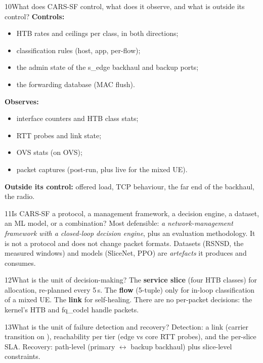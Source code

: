 \begin{qa}{10}{What does CARS-SF control, what does it observe, and what is outside its control?}
\textbf{Controls:}
\begin{itemize}
\item HTB rates and ceilings per class, in both directions;
\item classification rules (host, app, per-flow);
\item the admin state of the s\_edge backhaul and backup ports;
\item the forwarding database (MAC flush).
\end{itemize}
\textbf{Observes:}
\begin{itemize}
\item interface counters and HTB class stats;
\item RTT probes and link state;
\item OVS stats (on OVS);
\item packet captures (post-run, plus live for the mixed UE).
\end{itemize}
\textbf{Outside its control:} offered load, TCP behaviour, the far end of the backhaul, the radio.
\end{qa}

\begin{qa}{11}{Is CARS-SF a protocol, a management framework, a decision engine, a dataset, an ML model, or a combination?}
Most defensible: \emph{a network-management framework with a closed-loop decision engine}, plus an evaluation
methodology. It is not a protocol and does not change packet formats. Datasets (RSNSD, the measured windows)
and models (SliceNet, PPO) are \emph{artefacts} it produces and consumes.
\end{qa}

\begin{qa}{12}{What is the unit of decision-making?}
The \textbf{service slice} (four HTB classes) for allocation, re-planned every 5\,s. The \textbf{flow} (5-tuple) only
for in-loop classification of a mixed UE. The \textbf{link} for self-healing. There are no per-packet decisions:
the kernel's HTB and fq\_codel handle packets.
\end{qa}

\begin{qa}{13}{What is the unit of failure detection and recovery?}
Detection: a link (carrier transition on ), reachability per tier (edge vs core RTT probes), and the
per-slice SLA. Recovery: path-level (primary $\leftrightarrow$ backup backhaul) plus slice-level constraints.
\end{qa}

